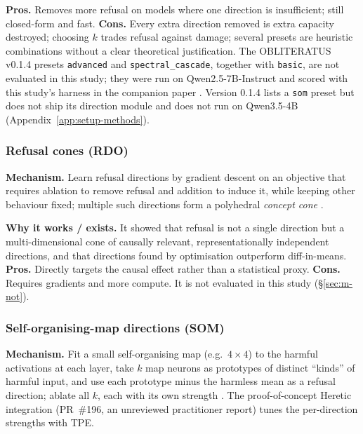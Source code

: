 \textbf{Pros.} Removes more refusal on models where one direction is
insufficient; still closed-form and fast.
\textbf{Cons.} Every extra direction removed is extra capacity destroyed;
choosing $k$ trades refusal against damage; several presets are heuristic
combinations without a clear theoretical justification. The OBLITERATUS
v0.1.4 presets \texttt{advanced} and \texttt{spectral\_cascade}, together with
\texttt{basic}, are not evaluated in this study; they were run on
Qwen2.5-7B-Instruct and scored with this study's harness in the companion
paper \cite{young2026paper30}. Version 0.1.4 lists a \texttt{som} preset but
does not ship its direction module and does not run on Qwen3.5-4B
(Appendix~\ref{app:setup-methods}).

\subsubsection{Refusal cones (RDO)}
\label{sec:m-rdo}
\textbf{Mechanism.} Learn refusal directions by gradient descent on an
objective that requires ablation to remove refusal and addition to induce it,
while keeping other behaviour fixed; multiple such directions form a
polyhedral \emph{concept cone} \cite{wollschlager2025geometry}.

\textbf{Why it works / exists.} It showed that refusal is not a single
direction but a multi-dimensional cone of causally relevant, representationally
independent directions, and that directions found by optimisation outperform
diff-in-means.
\textbf{Pros.} Directly targets the causal effect rather than a statistical
proxy. \textbf{Cons.} Requires gradients and more compute. It is not evaluated
in this study (\S\ref{sec:m-not}).

\subsubsection{Self-organising-map directions (SOM)}
\label{sec:m-som}
\textbf{Mechanism.} Fit a small self-organising map (e.g.\ $4\times4$) to the
harmful activations at each layer, take $k$ map neurons as prototypes of
distinct ``kinds'' of harmful input, and use each prototype minus the harmless
mean as a refusal direction; ablate all $k$, each with its own strength
\cite{piras2025som}. The proof-of-concept Heretic integration (PR~\#196, an unreviewed practitioner report)
tunes the per-direction strengths with TPE.

